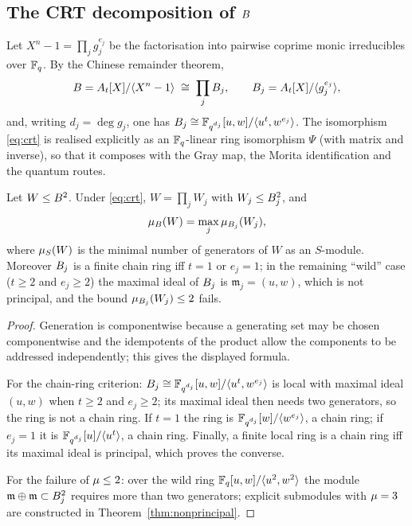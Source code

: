\subsection{The CRT decomposition of $B$}\label{subsec:crt}

Let $X^n-1=\prod_{j}g_j^{e_j}$ be the factorisation into pairwise coprime
monic irreducibles over $\mathbb F_q$. By the Chinese remainder theorem,
\begin{equation}\label{eq:crt}
  B=A_t[X]/\langle X^n-1\rangle
  \;\cong\;\prod_j B_j,\qquad
  B_j=A_t[X]/\langle g_j^{e_j}\rangle ,
\end{equation}
and, writing $d_j=\deg g_j$, one has $B_j\cong\mathbb F_{q^{d_j}}[u,w]/\langle u^t,w^{e_j}\rangle$.
The isomorphism \eqref{eq:crt} is realised explicitly as an $\mathbb F_q$-linear ring
isomorphism $\Psi$ (with matrix and inverse), so that it composes with the Gray
map, the Morita identification and the quantum routes.

\begin{lemma}\label{lem:components}
Let $W\le B^2$. Under \eqref{eq:crt}, $W=\prod_jW_j$ with
$W_j\le B_j^2$, and
\[
  \mu_{B}(W)=\max_j\mu_{B_j}(W_j),
\]
where $\mu_S(W)$ is the minimal number of generators of $W$ as an
$S$-module. Moreover $B_j$ is a finite chain ring iff $t=1$ or $e_j=1$; in
the remaining ``wild'' case ($t\ge2$ and $e_j\ge2$) the maximal ideal of
$B_j$ is $\mathfrak m_j=(u,w)$, which is not principal, and the bound
$\mu_{B_j}(W_j)\le2$ fails.
\end{lemma}

\begin{proof}
Generation is componentwise because a generating set may be chosen
componentwise and the idempotents of the product allow the components to be
addressed independently; this gives the displayed formula.

For the chain-ring criterion: $B_j\cong\mathbb F_{q^{d_j}}[u,w]/\langle
u^t,w^{e_j}\rangle$ is local with maximal ideal $(u,w)$ when $t\ge2$ and
$e_j\ge2$; its maximal ideal then needs two generators, so the ring is not a
chain ring. If $t=1$ the ring is $\mathbb F_{q^{d_j}}[w]/\langle w^{e_j}\rangle$, a
chain ring; if $e_j=1$ it is $\mathbb F_{q^{d_j}}[u]/\langle u^t\rangle$, a chain
ring. Finally, a finite local ring is a chain ring iff its maximal ideal is
principal, which proves the converse.

For the failure of $\mu\le2$: over the wild ring
$\mathbb F_q[u,w]/\langle u^2,w^2\rangle$ the module $\mathfrak m\oplus\mathfrak
m\subset B_j^2$ requires more than two generators; explicit submodules
with $\mu=3$ are constructed in Theorem~\ref{thm:nonprincipal}.
\end{proof}

